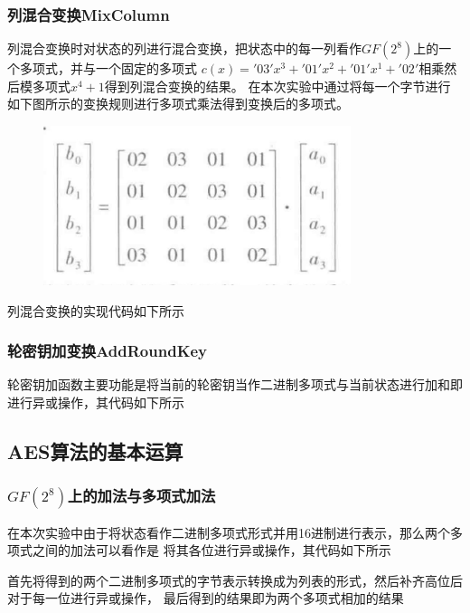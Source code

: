 \documentclass[a4paper,11pt,UTF8]{ctexart}
\newcommand{\bottomcaption}{%
\setlength{\abovecaptionskip}{6pt}%
\setlength{\belowcaptionskip}{6pt}%
\caption}
\newcommand{\xiaowuhao}{\fontsize{9pt}{\baselineskip}\selectfont}   %
\begin{document}
        \subsubsection{列混合变换MixColumn}
            列混合变换时对状态的列进行混合变换，把状态中的每一列看作$GF(2^{8})$上的一个多项式，并与一个固定的多项式
            $c(x)='03'x^{3} +'01'x^{2} +'01'x^{1} +'02'$相乘然后模多项式$x^{4} +1$得到列混合变换的结果。
            在本次实验中通过将每一个字节进行如下图所示的变换规则进行多项式乘法得到变换后的多项式。
            \begin{figure}[H]
                \centering
                \includegraphics[width=9cm]{列混合变换.jpg}
                \bottomcaption{\xiaowuhao{列混合变换}}
            \end{figure}
            列混合变换的实现代码如下所示
            

        \subsubsection{轮密钥加变换AddRoundKey}
            轮密钥加函数主要功能是将当前的轮密钥当作二进制多项式与当前状态进行加和即进行异或操作，其代码如下所示
            
              
    \subsection{AES算法的基本运算}

        \subsubsection{$GF(2^{8} )$上的加法与多项式加法}
            在本次实验中由于将状态看作二进制多项式形式并用16进制进行表示，那么两个多项式之间的加法可以看作是
            将其各位进行异或操作，其代码如下所示
            
            首先将得到的两个二进制多项式的字节表示转换成为列表的形式，然后补齐高位后对于每一位进行异或操作，
            最后得到的结果即为两个多项式相加的结果
\end{document}
